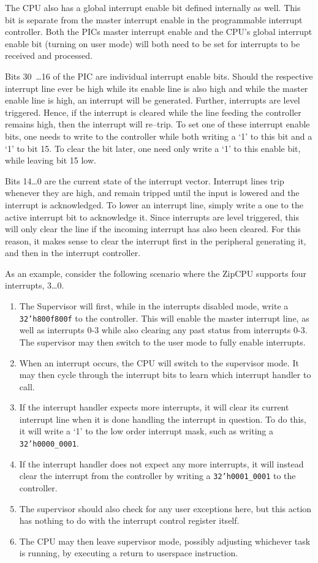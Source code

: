 \documentclass{gqtekspec}
\begin{document}
The CPU also has a global interrupt enable bit defined internally as well.  This
bit is separate from the master interrupt enable in the programmable interrupt
controller.  Both the PICs master interrupt enable and the CPU's global
interrupt enable bit (turning on user mode) will both need to be set for
interrupts to be received and processed.

Bits 30~\ldots 16 of the PIC are individual interrupt enable bits.  Should the
respective interrupt line ever be high while its enable line is also high and
while the master enable line is high, an interrupt will be generated.  Further,
interrupts are level triggered.  Hence, if the interrupt is cleared while the
line feeding the controller remains high, then the interrupt will re--trip.
To set one of these interrupt enable bits, one needs to write to the
controller while both writing a `1' to this bit and a `1' to bit 15.
To clear the bit later, one need only write a `1' to this enable bit,
while leaving bit 15 low.  

Bits 14\ldots 0 are the current state of the interrupt vector.  Interrupt lines
trip whenever they are high, and remain tripped until the input is lowered and
the interrupt is acknowledged.  To lower an interrupt line, simply write a one
to the active interrupt bit to acknowledge it.  Since interrupts are level
triggered, this will only clear the line if the incoming interrupt has also
been cleared.  For this reason, it makes sense to clear the interrupt first
in the peripheral generating it, and then in the interrupt controller.

As an example, consider the following scenario where the ZipCPU supports four
interrupts, 3\ldots0.
\begin{enumerate}
\item The Supervisor will first, while in the interrupts disabled mode,
	write a {\tt 32'h800f800f} to the controller.  This will enable the
	master interrupt line, as well as interrupts 0-3 while also clearing any
	past status from interrupts 0-3.  The supervisor may then
	switch to the user mode to fully enable interrupts.
\item When an interrupt occurs, the CPU will switch to the supervisor mode.
	It may then cycle through the interrupt bits to learn which
	interrupt handler to call.
\item If the interrupt handler expects more interrupts, it will clear its
	current interrupt line when it is done handling the interrupt in
	question.  To do this, it will write a `1' to the low order interrupt
	mask, such as writing a {\tt 32'h0000\_0001}.
\item If the interrupt handler does not expect any more interrupts, it will
	instead clear the interrupt from the controller by writing a 
	{\tt 32'h0001\_0001} to the controller.
\item The supervisor should also check for any user exceptions here,
	but this action has nothing to do with the interrupt control
	register itself.
\item The CPU may then leave supervisor mode, possibly adjusting
	whichever task is running, by executing a return to userspace
	instruction.
\end{enumerate}
\end{document}
